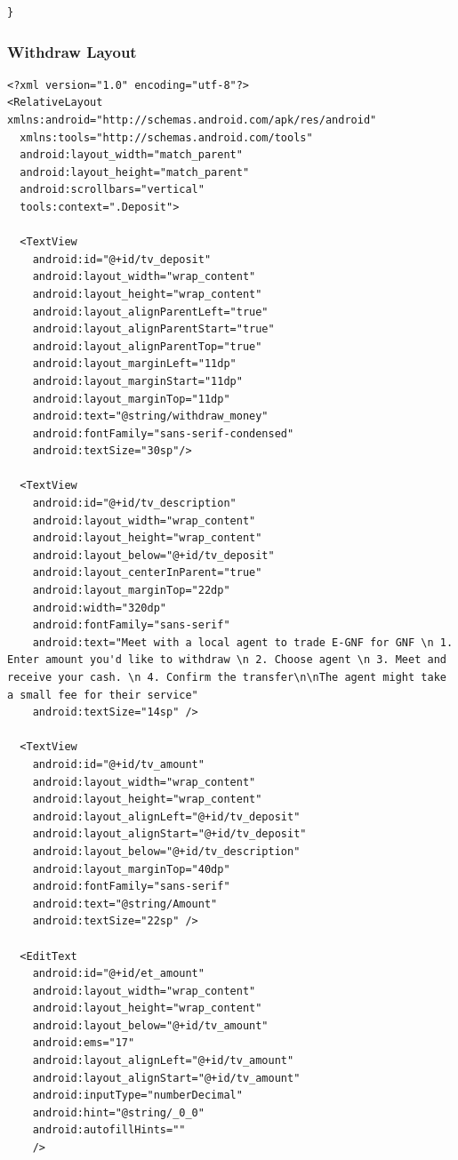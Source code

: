 \documentclass[11pt, a4paper]{article}
\begin{document}
\begin{appendices}
\begin{lstlisting}
}
\end{lstlisting}
\subsubsection{Withdraw Layout}
\begin{lstlisting}
<?xml version="1.0" encoding="utf-8"?>
<RelativeLayout xmlns:android="http://schemas.android.com/apk/res/android"
  xmlns:tools="http://schemas.android.com/tools"
  android:layout_width="match_parent"
  android:layout_height="match_parent"
  android:scrollbars="vertical"
  tools:context=".Deposit">

  <TextView
    android:id="@+id/tv_deposit"
    android:layout_width="wrap_content"
    android:layout_height="wrap_content"
    android:layout_alignParentLeft="true"
    android:layout_alignParentStart="true"
    android:layout_alignParentTop="true"
    android:layout_marginLeft="11dp"
    android:layout_marginStart="11dp"
    android:layout_marginTop="11dp"
    android:text="@string/withdraw_money"
    android:fontFamily="sans-serif-condensed"
    android:textSize="30sp"/>

  <TextView
    android:id="@+id/tv_description"
    android:layout_width="wrap_content"
    android:layout_height="wrap_content"
    android:layout_below="@+id/tv_deposit"
    android:layout_centerInParent="true"
    android:layout_marginTop="22dp"
    android:width="320dp"
    android:fontFamily="sans-serif"
    android:text="Meet with a local agent to trade E-GNF for GNF \n 1. Enter amount you'd like to withdraw \n 2. Choose agent \n 3. Meet and receive your cash. \n 4. Confirm the transfer\n\nThe agent might take a small fee for their service"
    android:textSize="14sp" />

  <TextView
    android:id="@+id/tv_amount"
    android:layout_width="wrap_content"
    android:layout_height="wrap_content"
    android:layout_alignLeft="@+id/tv_deposit"
    android:layout_alignStart="@+id/tv_deposit"
    android:layout_below="@+id/tv_description"
    android:layout_marginTop="40dp"
    android:fontFamily="sans-serif"
    android:text="@string/Amount"
    android:textSize="22sp" />

  <EditText
    android:id="@+id/et_amount"
    android:layout_width="wrap_content"
    android:layout_height="wrap_content"
    android:layout_below="@+id/tv_amount"
    android:ems="17"
    android:layout_alignLeft="@+id/tv_amount"
    android:layout_alignStart="@+id/tv_amount"
    android:inputType="numberDecimal"
    android:hint="@string/_0_0"
    android:autofillHints=""
    />


\end{lstlisting}
\end{appendices}
\end{document}
